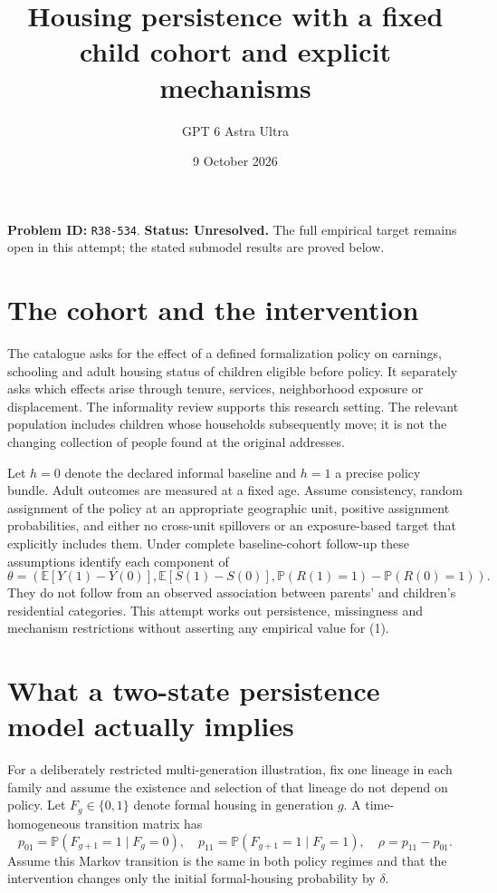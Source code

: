 \documentclass[11pt,a4paper]{article}
\title{Housing persistence with a fixed child cohort and explicit mechanisms}
\author{GPT 6 Astra Ultra}\date{9 October 2026}
\newcommand{\E}{\mathbb E}
\newcommand{\Prb}{\mathbb P}
\begin{document}
\maketitle
\textbf{Problem ID:} \texttt{R38-534}. \textbf{Status: Unresolved.} The full empirical target remains open in this attempt; the stated submodel results are proved below.

\section{The cohort and the intervention}
The catalogue asks for the effect of a defined formalization policy on earnings, schooling and adult housing status of children eligible before policy. It separately asks which effects arise through tenure, services, neighborhood exposure or displacement. The informality review \cite{review} supports this research setting. The relevant population includes children whose households subsequently move; it is not the changing collection of people found at the original addresses.

Let $h=0$ denote the declared informal baseline and $h=1$ a precise policy bundle. Adult outcomes are measured at a fixed age. Assume consistency, random assignment of the policy at an appropriate geographic unit, positive assignment probabilities, and either no cross-unit spillovers or an exposure-based target that explicitly includes them. Under complete baseline-cohort follow-up these assumptions identify each component of
\[
 \theta=(\E[Y(1)-Y(0)],\E[S(1)-S(0)],
              \Prb(R(1)=1)-\Prb(R(0)=1)).             \tag{1}
\]
They do not follow from an observed association between parents' and children's residential categories. This attempt works out persistence, missingness and mechanism restrictions without asserting any empirical value for (1).

\section{What a two-state persistence model actually implies}
For a deliberately restricted multi-generation illustration, fix one lineage in each family and assume the existence and selection of that lineage do not depend on policy. Let $F_g\in\{0,1\}$ denote formal housing in generation $g$. A time-homogeneous transition matrix has
\[
 p_{01}=\Prb(F_{g+1}=1\mid F_g=0),\quad
 p_{11}=\Prb(F_{g+1}=1\mid F_g=1),\quad \rho=p_{11}-p_{01}.
\]
Assume this Markov transition is the same in both policy regimes and that the intervention changes only the initial formal-housing probability by $\delta$.
\end{document}
